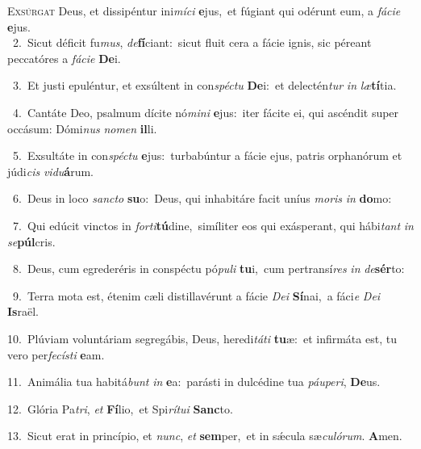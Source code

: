 \lettrine{\initial\textcolor{\initialcolor}{E}}{xsúrgat} Deus, et dissipéntur ini\-\textit{mí}\-\textit{ci} \textbf{e}\-jus,~\star et fúgiant qui odérunt eum, a \textit{fá}\-\textit{ci}\textit{e} \textbf{e}\-jus.\\
{\numbfont\textcolor{\numbcolor}{~2.}}~Sicut déficit fu\-\textit{mus}\-, \textit{de}\-\textbf{fí}ciant:~\star sicut fluit cera a fácie ignis, sic péreant peccatóres a \textit{fá}\-\textit{ci}\textit{e} \textbf{De}\-i.\par
{\numbfont\textcolor{\numbcolor}{~3.}}~Et justi epuléntur, et exsúltent in con\-\textit{spéc}\-\textit{tu} \textbf{De}\-i:~\star et delectén\textit{tur} \textit{in} \textit{læ}\-\textbf{tí}tia.\par
{\numbfont\textcolor{\numbcolor}{~4.}}~Cantáte Deo, psalmum dícite nó\-\textit{mi}\-\textit{ni} \textbf{e}\-jus:~\star iter fácite ei, qui ascéndit super occásum: Dómi\textit{nus} \textit{no}\-\textit{men} \textbf{il}\-li.\par
{\numbfont\textcolor{\numbcolor}{~5.}}~Exsultáte in con\-\textit{spéc}\-\textit{tu} \textbf{e}\-jus:~\star turbabúntur a fácie ejus, patris orphanórum et júdi\textit{cis} \textit{vi}\-\textit{du}\textbf{á}rum.\par
{\numbfont\textcolor{\numbcolor}{~6.}}~Deus in loco \textit{sanc}\-\textit{to} \textbf{su}\-o:~\star Deus, qui inhabitáre facit uníus \textit{mo}\-\textit{ris} \textit{in} \textbf{do}\-mo:\par
{\numbfont\textcolor{\numbcolor}{~7.}}~Qui edúcit vinctos in \textit{for}\-\textit{ti}\textbf{tú}dine,~\star simíliter eos qui exásperant, qui hábi\textit{tant} \textit{in} \textit{se}\-\textbf{púl}cris.\par
{\numbfont\textcolor{\numbcolor}{~8.}}~Deus, cum egrederéris in conspéctu pó\-\textit{pu}\-\textit{li} \textbf{tu}\-i,~\star cum pertransí\textit{res} \textit{in} \textit{de}\-\textbf{sér}to:\par
{\numbfont\textcolor{\numbcolor}{~9.}}~Terra mota est, étenim cæli distillavérunt a fácie \textit{De}\-\textit{i} \textbf{Sí}\-nai,~\star a fáci\textit{e} \textit{De}\-\textit{i} \textbf{Is}\-raël.\par
{\numbfont\textcolor{\numbcolor}{10.}}~Plúviam voluntáriam segregábis, Deus, heredi\-\textit{tá}\-\textit{ti} \textbf{tu}\-æ:~\star et infirmáta est, tu vero per\-\textit{fe}\-\textit{cís}\textit{ti} \textbf{e}\-am.\par
{\numbfont\textcolor{\numbcolor}{11.}}~Animália tua habitá\textit{bunt} \textit{in} \textbf{e}\-a:~\star parásti in dulcédine tua \textit{páu}\-\textit{pe}\textit{ri}, \textbf{De}\-us.\par
{\numbfont\textcolor{\numbcolor}{12.}}~Glória Pa\-\textit{tri}\-, \textit{et} \textbf{Fí}\-lio,~\star et Spi\-\textit{rí}\-\textit{tu}\textit{i} \textbf{Sanc}\-to.\par
{\numbfont\textcolor{\numbcolor}{13.}}~Sicut erat in princípio, et \textit{nunc}\-, \textit{et} \textbf{sem}\-per,~\star et in sǽcula sæ\-\textit{cu}\-\textit{ló}\textit{rum}. \textbf{A}\-men.\par
